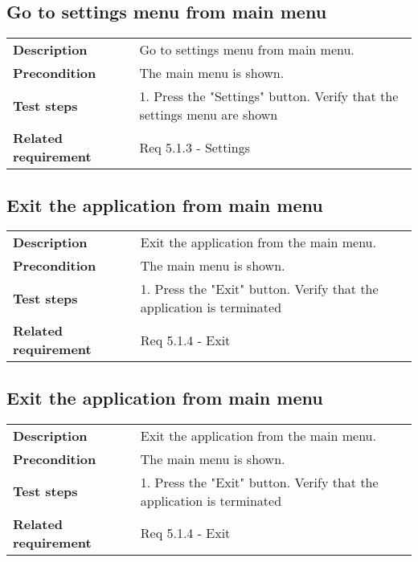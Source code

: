 \documentclass[a4paper,titlepage]{article}
\begin{document}
\subsection{Go to settings menu from main menu}
\begin{tabularx}{\textwidth}{lX}
	\textbf{Description}	&
		Go to settings menu from main menu.\\
	\textbf{Precondition}	&
		The main menu is shown.\\
	\textbf{Test steps}	&
		1. Press the "Settings" button\newline
		2. Verify that the settings menu are shown\\
	\textbf{Related requirement}	&
		Req 5.1.3 - Settings \\
\end{tabularx}

\subsection{Exit the application from main menu}
\begin{tabularx}{\textwidth}{lX}
	\textbf{Description}	&
		Exit the application from the main menu.\\
	\textbf{Precondition}	&
		The main menu is shown.\\
	\textbf{Test steps}	&
		1. Press the "Exit" button\newline
		2. Verify that the application is terminated\\
	\textbf{Related requirement}	&
		Req 5.1.4 - Exit \\
\end{tabularx}

\subsection{Exit the application from main menu}
\begin{tabularx}{\textwidth}{lX}
	\textbf{Description}	&
		Exit the application from the main menu.\\
	\textbf{Precondition}	&
		The main menu is shown.\\
	\textbf{Test steps}	&
		1. Press the "Exit" button\newline
		2. Verify that the application is terminated\\
	\textbf{Related requirement}	&
		Req 5.1.4 - Exit \\
\end{tabularx}
\end{document}
